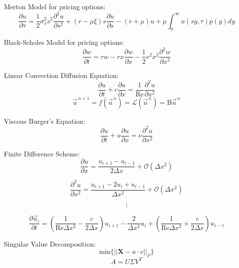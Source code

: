 \documentclass{article}
\begin{document}
Merton Model for pricing options:
$$\frac{\partial u}{\partial \tau} = \frac{1}{2} \sigma^2_s s^2 \frac{\partial^2 u}{\partial s^2} + (r-\mu \xi) s \frac{\partial u}{\partial s} - (r+\mu)u + \mu \int_{0}^{\infty}u (sy,\tau)p(y)dy$$

Black-Scholes Model for pricing options:
$$\frac{\partial w}{\partial t} = rw - rx \frac{\partial w}{\partial x} - \frac{1}{2} v^2 x^2 \frac{\partial^2 w}{\partial x^2}$$

Linear Convection Diffusion Equation:
$$\frac{\partial u}{\partial t} + c \frac{\partial u}{\partial x} = \frac{1}{\mathrm{Re}} \frac{\partial^2 u}{\partial x^2}$$
$$\vec{u}^{\,n+1} = f(\vec{u}^{\,n}) = \mathcal{L}(\vec{u}^{\,n}) = \mathrm{B} \vec{u}^{\,n}$$

Viscous Burger's Equation:
$$\frac{\partial u}{\partial t} + u \frac{\partial u}{\partial x} = \nu \frac{\partial^2 u}{\partial x^2}$$

Finite Difference Scheme:
$$\frac{\partial u}{\partial x} = \frac{u_{i+1} - u_{i-1}}{2 \Delta x} + \mathcal{O}(\Delta x^2)$$

$$\frac{\partial^2 u}{\partial x^2} = \frac{u_{i+1} - 2u_i + u_{i-1}}{\Delta x^2} + \mathcal{O}(\Delta x^2)$$

$$\vdots$$

$$\frac{\partial \vec{u}_i}{\partial t} = \left(\frac{1}{\mathrm{Re} \Delta x^2} - \frac{c}{2 \Delta x}\right)u_{i+1} - \frac{2}{\Delta x^2} u_i + \left( \frac{1}{\mathrm{Re} \Delta x^2} + \frac{c}{2 \Delta x} \right) u_{i-1}$$

Singular Value Decomposition:
$$\mathrm{min} \{ ||\textbf{X} - u \cdot v||_F \}$$
$$A = U \Sigma V^T$$
\end{document}
